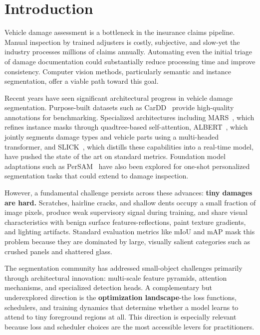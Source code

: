 \documentclass[10pt,twocolumn]{article}
\begin{document}
\section{Introduction}
\label{sec:intro}

Vehicle damage assessment is a bottleneck in the insurance claims pipeline. Manual inspection by trained adjusters is costly, subjective, and slow-yet the industry processes millions of claims annually. Automating even the initial triage of damage documentation could substantially reduce processing time and improve consistency. Computer vision methods, particularly semantic and instance segmentation, offer a viable path toward this goal.

Recent years have seen significant architectural progress in vehicle damage segmentation. Purpose-built datasets such as CarDD~\cite{wang2023cardd} provide high-quality annotations for benchmarking. Specialized architectures including MARS~\cite{panboonyuen2023mars}, which refines instance masks through quadtree-based self-attention, ALBERT~\cite{panboonyuen2025albert}, which jointly segments damage types and vehicle parts using a multi-headed transformer, and SLICK~\cite{panboonyuen2025slick}, which distills these capabilities into a real-time model, have pushed the state of the art on standard metrics. Foundation model adaptations such as PerSAM~\cite{zhang2023persam} have also been explored for one-shot personalized segmentation tasks that could extend to damage inspection.

However, a fundamental challenge persists across these advances: \textbf{tiny damages are hard.} Scratches, hairline cracks, and shallow dents occupy a small fraction of image pixels, produce weak supervisory signal during training, and share visual characteristics with benign surface features-reflections, paint texture gradients, and lighting artifacts. Standard evaluation metrics like mIoU and mAP mask this problem because they are dominated by large, visually salient categories such as crushed panels and shattered glass.

The segmentation community has addressed small-object challenges primarily through architectural innovation: multi-scale feature pyramids, attention mechanisms, and specialized detection heads. A complementary but underexplored direction is the \textbf{optimization landscape}-the loss functions, schedulers, and training dynamics that determine whether a model learns to attend to tiny foreground regions at all. This direction is especially relevant because loss and scheduler choices are the most accessible levers for practitioners.
\end{document}
